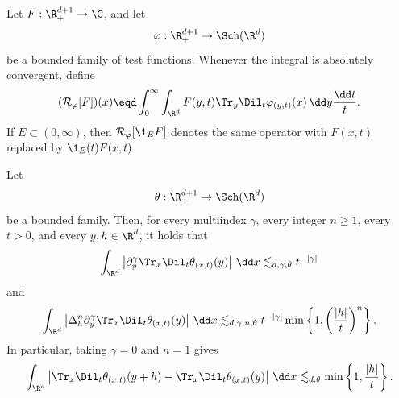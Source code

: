 \begin{definition}\label{def:reconstruction-operator}
  Let \(F : \R^{d + 1}_+ \to \C\), and let
  \[
    \varphi : \R^{d + 1}_+ \to \Sch(\R^d)
  \]
  be a bounded family of test functions. Whenever the integral is absolutely
  convergent, define
  \begin{equation}
    \label{eq:reconstruction-operator}
    (\mathcal{R}_{\varphi}[F])(x)
    \eqd
    \int_0^{\infty} \int_{\R^d}
    F(y, t) \Tr_y \Dil_t \varphi_{(y, t)}(x)
    \, \dd y \frac{\dd t}{t}.
  \end{equation}
  If \(E \subset (0, \infty)\), then \(\mathcal{R}_{\varphi}[\1_E F]\)
  denotes the same operator with \(F(x, t)\) replaced by
  \(\1_E(t)F(x, t)\).
\end{definition}

\begin{lemma}\label{lem:kernel-bounds}
  Let
  \[
    \theta : \R^{d + 1}_+ \to \Sch(\R^d)
  \]
  be a bounded family. Then, for every multiindex \(\gamma\), every integer
  \(n \ge 1\), every \(t > 0\), and every \(y, h \in \R^d\), it holds that
  \begin{equation}
    \label{eq:kernel-derivative-l1}
    \int_{\R^d}
    \left|
      \partial_y^{\gamma}
      \Tr_x \Dil_t \theta_{(x, t)}(y)
    \right|
    \, \dd x
    \lesssim_{d, \gamma, \theta}
    t^{-|\gamma|}
  \end{equation}
  and
  \begin{equation}
    \label{eq:kernel-finite-difference-bound}
    \int_{\R^d}
    \left|
      \Delta_h^n
      \partial_y^{\gamma}
      \Tr_x \Dil_t \theta_{(x, t)}(y)
    \right|
    \, \dd x
    \lesssim_{d, \gamma, n, \theta}
    t^{-|\gamma|}
    \min
    \left\{
      1,
      \left(\frac{|h|}{t}\right)^n
    \right\}.
  \end{equation}
  In particular, taking \(\gamma = 0\) and \(n = 1\) gives
  \[
    \int_{\R^d}
    \left|
      \Tr_x \Dil_t \theta_{(x, t)}(y + h)
      -
      \Tr_x \Dil_t \theta_{(x, t)}(y)
    \right|
    \, \dd x
    \lesssim_{d, \theta}
    \min
    \left\{
      1,
      \frac{|h|}{t}
    \right\}.
  \]
\end{lemma}

{}

